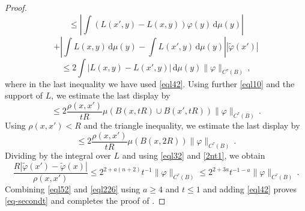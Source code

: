 \begin{proof}
\begin{equation}
    \le \left| \int (L(x',y)-L(x,y)) \varphi(y) \, \mathrm{d}\mu(y)\right|
\end{equation}
\begin{equation}\label{eql22}
    + \left| \int L(x,y) \, \mathrm{d}\mu(y)-\int L(x',y) \, \mathrm{d}\mu(y)\right||\tilde{\varphi}(x')|
\end{equation}
\begin{equation}\label{eql23}
    \le 2 \int |L(x,y) -L(x',y)| \, \mathrm{d}\mu(y)
    \|\varphi\|_{C^\tau(B)}\, ,
\end{equation}
where in the last inequality we have used \eqref{eql42}.
Using further \eqref{eql10} and the support of $L$, we estimate the last display by
\begin{equation}\label{eql224}\le 2 \frac{\rho(x,x')} {tR}\mu(B(x,tR)\cup B(x',tR))
\|\varphi\|_{C^\tau(B)}\, .
    \end{equation}
  Using $\rho(x,x')<R$ and the triangle inequality, we estimate the last display by
\begin{equation}\label{eql225}\le 2
\frac{\rho(x,x')} {tR}
\mu(B(x,2R))
\|\varphi\|_{C^\tau(B)}\, .
    \end{equation}
Dividing by the integral over $L$ and using \eqref{eql32} and \eqref{2nt1}, we obtain
\begin{equation}\label{eql226}
 \frac {R |\tilde{\varphi}(x') - \tilde \varphi(x)|}{\rho(x,x')}
 \le 2^{2+a(n+2)}t^{-1}\|\varphi\|_{C^\tau(B)} \le
 2^{2+3a} t^{-1-a} \|\varphi\|_{C^\tau(B)}\, .
\end{equation}
Combining \eqref{eql52} and \eqref{eql226} using $a\ge 4$ and $t\le 1$ and
adding \eqref{eql42} proves \eqref{eq-secondt} and completes the proof
of .
\end{proof}



